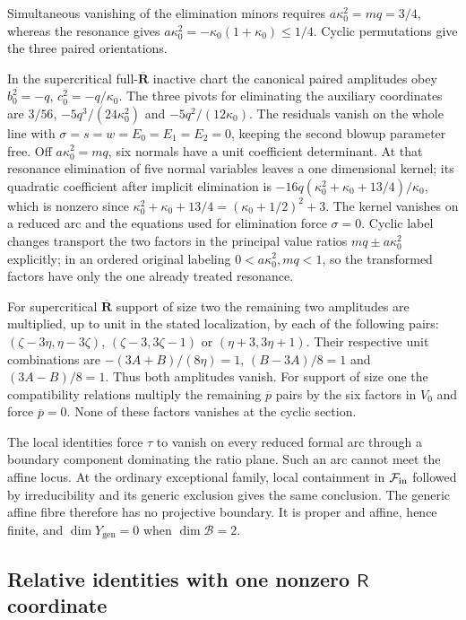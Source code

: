 \documentclass[11pt,a4paper]{article}
\numberwithin{equation}{section}
\theoremstyle{plain}
\theoremstyle{definition}
\theoremstyle{remark}
\begin{document}
Simultaneous vanishing of the elimination minors requires
$a\kappa_0^2=mq=3/4$, whereas the resonance gives
$a\kappa_0^2=-\kappa_0(1+\kappa_0)\le1/4$.
Cyclic permutations give the three paired orientations.

In the supercritical full-$\overline{\boldsymbol R}$ inactive chart the canonical paired amplitudes obey $b_0^2=-q$, $c_0^2=-q/\kappa_0 $. The three pivots for eliminating the auxiliary coordinates are $3/56$, $-5q^3/(24\kappa_0 ^2)$ and $-5q^2/(12\kappa_0 )$. The residuals vanish on the whole line with $\sigma=s=w=E_0=E_1=E_2=0$, keeping the second blowup parameter free. Off $a\kappa_0 ^2=mq$, six normals have a unit coefficient determinant. At that resonance elimination of five normal variables leaves a one dimensional kernel; its quadratic coefficient after implicit elimination is $-16q(\kappa_0 ^2+\kappa_0 +13/4)/\kappa_0 $, which is nonzero since $\kappa_0 ^2+\kappa_0 +13/4=(\kappa_0 +1/2)^2+3$. The kernel vanishes on a reduced arc and the equations used for elimination force $\sigma=0$. Cyclic label changes transport the two factors in the principal value ratios $mq\pm a\kappa_0 ^2$ explicitly; in an ordered original labeling $0<a\kappa_0 ^2,mq<1$, so the transformed factors have only the one already treated resonance.

For supercritical $\overline{\boldsymbol R}$ support of size two the remaining two amplitudes are multiplied, up to unit in the stated localization, by each of the following pairs: $(\zeta -3\eta ,\eta -3\zeta )$, $(\zeta -3,3\zeta -1)$ or $(\eta +3,3\eta +1)$. Their respective unit combinations are $-(3A+B)/(8\eta )=1$, $(B-3A)/8=1$ and $(3A-B)/8=1$. Thus both amplitudes vanish. For support of size one the compatibility relations multiply the remaining $\overline p$ pairs by the six factors in $V_0$ and force $\overline p=0$. None of these factors vanishes at the cyclic section. 

The local identities force $\tau$ to vanish on every reduced formal
arc through a boundary component dominating the ratio plane. Such an
arc cannot meet the affine locus. At the ordinary exceptional family,
local containment in $\mathcal F_{\rm in}$ followed by irreducibility
and its generic exclusion gives the same conclusion. The generic
affine fibre therefore has no projective boundary. It is proper and
affine, hence finite, and $\dim Y_{\mathrm{gen}}=0$ when $\dim\mathscr B=2$.

\subsection{Relative identities with one nonzero \texorpdfstring{$\mathsf R$}{R} coordinate}
\label{appr3whole:identities}
\end{document}
